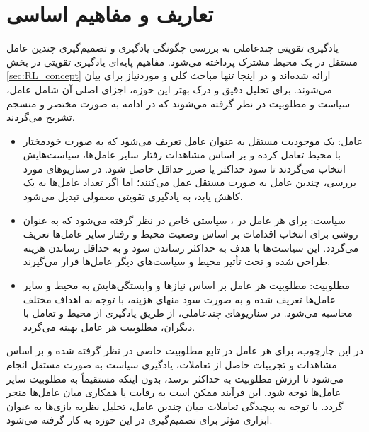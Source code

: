 \section{تعاریف و مفاهیم اساسی }\label{sec:marl_definitions}
یادگیری تقویتی چندعاملی به بررسی چگونگی یادگیری و تصمیم‌گیری چندین عامل مستقل در یک محیط مشترک پرداخته می‌شود. مفاهیم پایه‌ای یادگیری تقویتی در بخش \ref{sec:RL_concept} ارائه شده‌اند و در اینجا تنها مباحث کلی و موردنیاز برای  بیان می‌شوند. برای تحلیل دقیق و درک بهتر این حوزه، اجزای اصلی آن شامل عامل، سیاست و مطلوبیت در نظر گرفته می‌شوند که در ادامه به صورت مختصر و منسجم تشریح می‌گردند.

\begin{itemize}
	\item عامل: یک موجودیت مستقل به عنوان عامل تعریف می‌شود که به صورت خودمختار با محیط تعامل کرده و بر اساس مشاهدات رفتار سایر عامل‌ها، سیاست‌هایش انتخاب می‌گردند تا سود حداکثر یا ضرر حداقل حاصل شود. در سناریوهای مورد بررسی، چندین عامل به صورت مستقل عمل می‌کنند؛ اما اگر تعداد عامل‌ها به یک کاهش یابد،  به یادگیری تقویتی معمولی تبدیل می‌شود.
	
	\item سیاست: برای هر عامل در ، سیاستی خاص در نظر گرفته می‌شود که به عنوان روشی برای انتخاب اقدامات بر اساس وضعیت محیط و رفتار سایر عامل‌ها تعریف می‌گردد. این سیاست‌ها با هدف به حداکثر رساندن سود و به حداقل رساندن هزینه طراحی شده و تحت تأثیر محیط و سیاست‌های دیگر عامل‌ها قرار می‌گیرند.
	
	\item مطلوبیت: مطلوبیت
	هر عامل بر اساس نیازها و وابستگی‌هایش به محیط و سایر عامل‌ها تعریف شده و به صورت سود منهای هزینه، با توجه به اهداف مختلف محاسبه می‌شود. در سناریوهای چندعاملی، از طریق یادگیری از محیط و تعامل با دیگران، مطلوبیت هر عامل بهینه می‌گردد.
\end{itemize}

در این چارچوب، برای هر عامل در  تابع مطلوبیت خاصی در نظر گرفته شده و بر اساس مشاهدات و تجربیات حاصل از تعاملات، یادگیری سیاست به صورت مستقل انجام می‌شود تا ارزش مطلوبیت به حداکثر برسد، بدون اینکه مستقیماً به مطلوبیت سایر عامل‌ها توجه شود. این فرآیند ممکن است به رقابت یا همکاری میان عامل‌ها منجر گردد.
 با توجه به پیچیدگی تعاملات میان چندین عامل، تحلیل نظریه بازی‌ها به عنوان ابزاری مؤثر برای تصمیم‌گیری در این حوزه به کار گرفته می‌شود.
 
 
 
